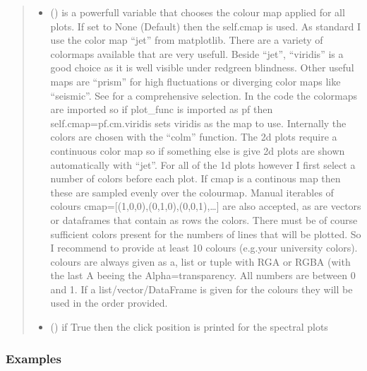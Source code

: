 \documentclass[letterpaper,10pt,english]{sphinxmanual}
\begin{document}
\begin{fulllineitems}
\begin{fulllineitems}
\begin{quote}
\begin{description}
\begin{itemize}
\item {} 
 (\sphinxstyleliteralemphasis{\sphinxupquote{, }}) \textendash{} is a powerfull variable that chooses the colour map applied for all plots. If set to
None (Default) then the self.cmap is used.
As standard I use the color map “jet” from matplotlib. There are a variety of colormaps
available that are very usefull. Beside “jet”, “viridis” is a good choice as it is well
visible under red\sphinxhyphen{}green blindness. Other useful maps are “prism” for high fluctuations
or diverging color maps like “seismic”.
See  for a comprehensive
selection. In the code the colormaps are imported so if plot\_func is imported as pf then
self.cmap=pf.cm.viridis sets viridis as the map to use. Internally the colors are chosen
with the “colm” function. The 2d plots require a continuous color map so if something
else is give 2d plots are shown automatically with “jet”. For all of the 1d plots however
I first select a number of colors before each plot. If cmap is a continous map then these
are sampled evenly over the colourmap. Manual iterables of colours
cmap={[}(1,0,0),(0,1,0),(0,0,1),…{]} are also accepted, as are vectors or dataframes that
contain as rows the colors. There must be of course sufficient colors present for
the numbers of lines that will be plotted. So I recommend to provide at least 10 colours
(e.g.your university colors). colours are always given as a, list or tuple with RGA or RGBA
(with the last A beeing the Alpha=transparency. All numbers are between 0 and 1.
If a list/vector/DataFrame is given for the colours they will be used in the order provided.

\item {} 
 (\sphinxstyleliteralemphasis{\sphinxupquote{, }}) \textendash{} if True then the click position is printed for the spectral plots

\end{itemize}

\end{description}\end{quote}
\subsubsection*{Examples}


\end{fulllineitems}
\end{fulllineitems}
\end{document}
